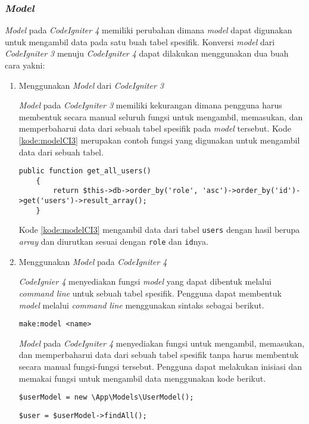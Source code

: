\subsubsection{\textit{Model}}
\textit{Model} pada \textit{CodeIgniter 4} memiliki perubahan dimana \textit{model} dapat digunakan untuk mengambil data pada satu buah tabel spesifik. Konversi \textit{model} dari \textit{CodeIgniter 3} menuju \textit{CodeIgniter 4} dapat dilakukan menggunakan dua buah cara yakni:
\begin{enumerate}
\item Menggunakan \textit{Model} dari \textit{CodeIgniter 3}

\textit{Model} pada \textit{CodeIgniter 3} memiliki kekurangan dimana pengguna harus membentuk secara manual seluruh fungsi untuk mengambil, memasukan, dan memperbaharui data dari sebuah tabel spesifik pada \textit{model} tersebut. Kode \ref{kode:modelCI3} merupakan contoh fungsi yang digunakan untuk mengambil data dari sebuah tabel.
\begin{lstlisting}[caption=Contoh fungsi untuk mengambil data seluruh user, label=kode:modelCI3]
public function get_all_users()
	{
		return $this->db->order_by('role', 'asc')->order_by('id')->get('users')->result_array();
	}
\end{lstlisting}

Kode \ref{kode:modelCI3} mengambil data dari tabel \texttt{users} dengan hasil berupa \textit{array} dan diurutkan sesuai dengan \texttt{role} dan \texttt{id}nya.

\item Menggunakan \textit{Model} pada \textit{CodeIgniter 4}

\textit{CodeIgnier 4} menyediakan fungsi \textit{model} yang dapat dibentuk melalui \textit{command line} untuk sebuah tabel spesifik. Pengguna dapat membentuk \textit{model} melalui \textit{command line} menggunakan sintaks sebagai berikut.
\begin{center}
	\verb|make:model <name>|
\end{center}
\textit{Model} pada \textit{CodeIgniter 4} menyediakan fungsi untuk mengambil, memasukan, dan memperbaharui data dari sebuah tabel spesifik tanpa harus membentuk secara manual fungsi-fungsi tersebut. Pengguna dapat melakukan inisiasi dan memakai fungsi untuk mengambil data menggunakan kode berikut.
\begin{center}
	\verb|$userModel = new \App\Models\UserModel();|
\end{center}
\begin{center}
	\verb|$user = $userModel->findAll();|
\end{center}
\end{enumerate}

